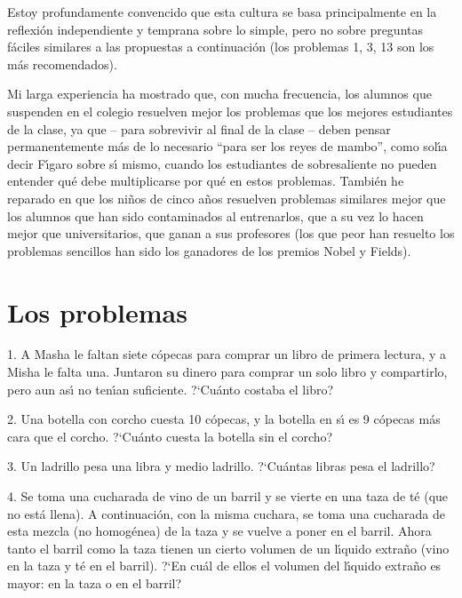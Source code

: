Estoy profundamente convencido que esta cultura se basa principalmente en la reflexi\'on independiente y
temprana sobre lo simple, pero no sobre preguntas f\'aciles similares a las propuestas a continuaci\'on 
(los problemas 1, 3, 13 son los m\'as recomendados).

Mi larga experiencia ha mostrado que, con mucha frecuencia, los alumnos que suspenden en el colegio 
resuelven mejor los problemas que los mejores estudiantes de la clase, ya que -- para sobrevivir al final
 de la clase -- deben pensar permanentemente m\'as de lo necesario \enquote{para ser los reyes de mambo}, 
 como sol\'{\i}a decir F\'{\i}garo sobre s\'{\i} mismo,
cuando los estudiantes de sobresaliente no pueden entender qu\'e debe multiplicarse por qu\'e en estos problemas.
Tambi\'en he reparado en que los ni\~nos de cinco a\~nos resuelven problemas similares mejor 
que los alumnos que han sido contaminados al entrenarlos, que a su vez lo hacen mejor que universitarios, 
que ganan a sus profesores (los que peor han resuelto los problemas sencillos han sido los ganadores de los premios 
Nobel y Fields).   

\clearpage
\section*{Los problemas}

\begin{problem}{1.}
	A Masha le faltan siete c\'opecas para comprar un libro de primera lectura, y a Misha le falta una.
	Juntaron su dinero para comprar un solo libro y compartirlo, pero aun as\'{\i} no ten\'{\i}an suficiente.
	?`Cu\'anto costaba el libro?
\end{problem}

\begin{problem}{2.}
	Una botella con corcho cuesta 10 c\'opecas, y la botella en s\'{\i} es 9 c\'opecas m\'as cara 
	que el corcho. ?`Cu\'anto cuesta la botella sin el corcho?
\end{problem}

\begin{problem}{3.}
	Un ladrillo pesa una libra y medio ladrillo. ?`Cu\'antas libras pesa el ladrillo?
\end{problem}

\begin{problem}{4.}
	Se toma una cucharada de vino de un barril y se vierte en una taza de t\'e (que no est\'a llena).
	A continuaci\'on, con la misma cuchara, se toma una cucharada de esta mezcla (no homog\'enea) de la taza y se vuelve a 
	poner en el barril.
	Ahora tanto el barril como la taza tienen un cierto volumen de un l\'{\i}quido extra\~no (vino en la taza y t\'e en el
	barril). ?`En cu\'al de ellos el volumen del l\'{\i}quido extra\~no es mayor: en la taza o en el barril?
\end{problem}

